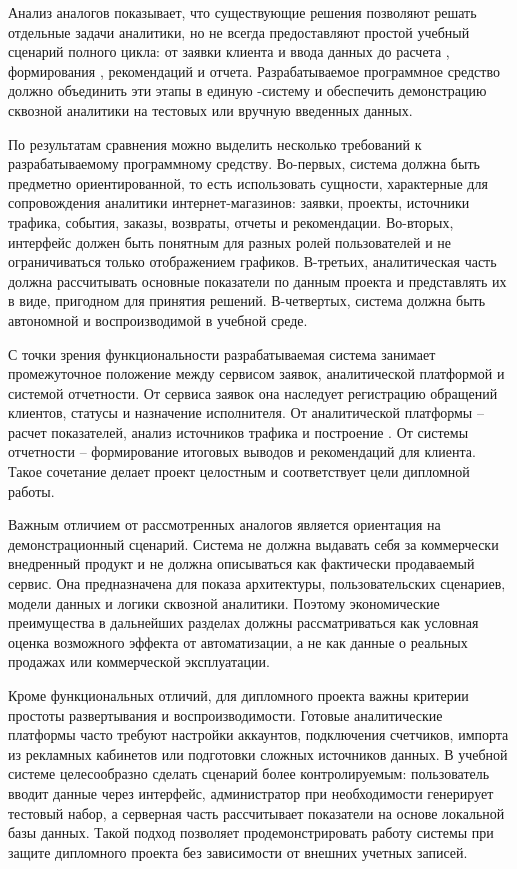 Анализ аналогов показывает, что существующие решения позволяют решать отдельные задачи  аналитики, но не всегда предоставляют простой учебный сценарий полного цикла: от заявки клиента и ввода данных до расчета , формирования , рекомендаций и отчета. Разрабатываемое программное средство должно объединить эти этапы в единую -систему и обеспечить демонстрацию сквозной аналитики на тестовых или вручную введенных данных.

По результатам сравнения можно выделить несколько требований к разрабатываемому программному средству. Во-первых, система должна быть предметно ориентированной, то есть использовать сущности, характерные для сопровождения аналитики интернет-магазинов: заявки, проекты, источники трафика, события, заказы, возвраты, отчеты и рекомендации. Во-вторых, интерфейс должен быть понятным для разных ролей пользователей и не ограничиваться только отображением графиков. В-третьих, аналитическая часть должна рассчитывать основные показатели по данным проекта и представлять их в виде, пригодном для принятия решений. В-четвертых, система должна быть автономной и воспроизводимой в учебной среде.

С точки зрения функциональности разрабатываемая система занимает промежуточное положение между сервисом заявок, аналитической платформой и системой отчетности. От сервиса заявок она наследует регистрацию обращений клиентов, статусы и назначение исполнителя. От аналитической платформы -- расчет показателей, анализ источников трафика и построение . От системы отчетности -- формирование итоговых выводов и рекомендаций для клиента. Такое сочетание делает проект целостным и соответствует цели дипломной работы.

Важным отличием от рассмотренных аналогов является ориентация на демонстрационный сценарий. Система не должна выдавать себя за коммерчески внедренный продукт и не должна описываться как фактически продаваемый сервис. Она предназначена для показа архитектуры, пользовательских сценариев, модели данных и логики сквозной аналитики. Поэтому экономические преимущества в дальнейших разделах должны рассматриваться как условная оценка возможного эффекта от автоматизации, а не как данные о реальных продажах или коммерческой эксплуатации.

Кроме функциональных отличий, для дипломного проекта важны критерии простоты развертывания и воспроизводимости. Готовые аналитические платформы часто требуют настройки аккаунтов, подключения счетчиков, импорта из рекламных кабинетов или подготовки сложных источников данных. В учебной системе целесообразно сделать сценарий более контролируемым: пользователь вводит данные через интерфейс, администратор при необходимости генерирует тестовый набор, а серверная часть рассчитывает показатели на основе локальной базы данных. Такой подход позволяет продемонстрировать работу системы при защите дипломного проекта без зависимости от внешних учетных записей.

